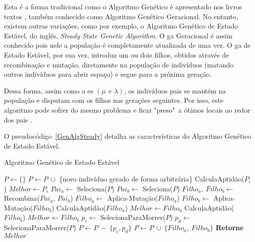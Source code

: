 Esta é a forma tradicional como o Algoritmo Genético é apresentado nos livros 
textos \citep{Luke2013Metaheuristics}, também conhecido como Algoritmo Genético 
Geracional. No entanto, existem outras variações, como por exemplo, o Algoritmo 
Genético de Estado Estável, do inglês, \textit{Steady State Genetic Algorithm}.
O \ac{ga} Geracional é assim conhecido pois nele a população é completamente 
atualizada de uma vez. O \ac{ga} de Estado Estável, por sua vez, introduz um 
ou dois filhos, obtidos através de recombinação e mutação, diretamente na 
população de indivíduos (matando outros indivíduos para abrir espaço) e segue 
para a próxima geração.

Dessa forma, assim como a \ac{es} $( \mu + \lambda )$, os indivíduos pais se 
mantém na população e disputam com os filhos nas gerações seguintes. Por isso, 
este algoritmo pode sofrer do mesmo problema e ficar "preso"\ a ótimos locais ao 
redor dos pais \citep{Luke2013Metaheuristics}.

O pseudocódigo~\ref{GenAlgSteady} detalha as características do Algoritmo 
Genético de Estado Estável.

\begin{algorithm}[h]                      %
	\caption{Algoritmo Genético de Estado Estável}          %
	\label{GenAlgSteady}                           %
	\begin{algorithmic}                   %
		\State $P \gets \{\} $
			\State $P \gets P \ \cup $ \{novo indivíduo gerado de forma arbitrária\} 
		\EndFor
			\State CalculaAptidão($P_{i}$)
				\State $Melhor \gets P_{i}$
			\EndIf
		\EndFor
		\Repeat
			\State $Pai_{a} \gets $ Seleciona($P$)
			\State $Pai_{b} \gets $ Seleciona($P$)
			\State $Filho_{a},\ Filho_{b} \gets $ Recombina($Pai_{a}$, $Pai_{b}$)
			\State $Filho_{a} \gets $ Aplica-Mutação($Filho_{a}$)
			\State $Filho_{b} \gets $ Aplica-Mutação($Filho_{b}$)
			\State CalculaAptidão($Filho_{a}$)
				\State $Melhor \gets Filho_{a}$
			\EndIf
			\State CalculaAptidão($Filho_{b}$)
				\State $Melhor \gets Filho_{b}$
			\EndIf
			\State $p_{c} \gets $ SelecionaParaMorrer($P$) 
			\State $p_{d} \gets $ SelecionaParaMorrer($P$) 
			\State $P \gets P\ -\ \{p_{c},p_{d}\}$
			\State $P \gets P\ \cup\ \{Filho_{a},\ Filho_{b}\}$
		\State \textbf{Retorne} $Melhor$
		\EndProcedure
	\end{algorithmic}
\end{algorithm}


